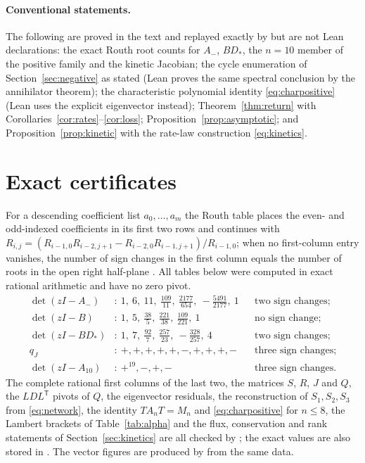 \documentclass[11pt,a4paper]{article}
\theoremstyle{plain}
\theoremstyle{definition}
\theoremstyle{remark}
\newcommand{\Aminus}{A_{-}}
\newcommand{\T}{\mathsf T}
\begin{document}
\paragraph{Conventional statements.}
The following are proved in the text and replayed exactly by  but are not Lean declarations: the exact Routh root counts for $\Aminus$, $BD_*$, the $n=10$ member of the positive family and the kinetic Jacobian; the cycle enumeration of Section~\ref{sec:negative} as stated (Lean proves the same spectral conclusion by the annihilator theorem); the characteristic polynomial identity \eqref{eq:charpositive} (Lean uses the explicit eigenvector instead); Theorem~\ref{thm:return} with Corollaries~\ref{cor:rates}--\ref{cor:loss}; Proposition~\ref{prop:asymptotic}; and Proposition~\ref{prop:kinetic} with the rate-law construction \eqref{eq:kinetics}.

\section{Exact certificates}\label{app:cert}

For a descending coefficient list $a_0,\dots,a_m$ the Routh table places the even- and odd-indexed coefficients in its first two rows and continues with $R_{i,j}=(R_{i-1,0}R_{i-2,j+1}-R_{i-2,0}R_{i-1,j+1})/R_{i-1,0}$; when no first-column entry vanishes, the number of sign changes in the first column equals the number of roots in the open right half-plane \citep[Chapter~XV]{Gantmacher1959}. All tables below were computed in exact rational arithmetic and have no zero pivot.
\begin{align*}
\det(zI-\Aminus)&:\ 1,\ 6,\ 11,\ \tfrac{109}{11},\ \tfrac{2177}{654},\ -\tfrac{5491}{2177},\ 1 && \text{two sign changes;}\\
\det(zI-B)&:\ 1,\ 5,\ \tfrac{38}{5},\ \tfrac{221}{38},\ \tfrac{109}{221},\ 1 && \text{no sign change;}\\
\det(zI-BD_*)&:\ 1,\ 7,\ \tfrac{92}{7},\ \tfrac{257}{23},\ -\tfrac{328}{257},\ 4 && \text{two sign changes;}\\
q_J&:\ +,+,+,+,+,-,+,+,+,- && \text{three sign changes;}\\
\det(zI-A_{10})&:\ +^{19},-,+,- && \text{three sign changes.}
\end{align*}
The complete rational first columns of the last two, the matrices $S$, $R$, $J$ and $Q$, the $LDL^{\T}$ pivots of $Q$, the eigenvector residuals, the reconstruction of $S_1,S_2,S_3$ from \eqref{eq:network}, the identity $T A_nT=M_n$ and \eqref{eq:charpositive} for $n\le8$, the Lambert brackets of Table~\ref{tab:alpha} and the flux, conservation and rank statements of Section~\ref{sec:kinetics} are all checked by ; the exact values are also stored in . The vector figures are produced by  from the same data.



\end{document}
